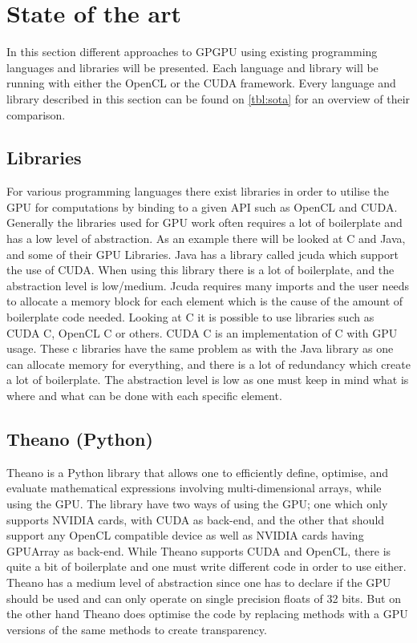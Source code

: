 \section{State of the art} %
\label{sec:state_of_the_art}
In this section different approaches to GPGPU using existing programming languages and libraries will be presented.
Each language and library will be running with either the OpenCL or the CUDA framework.
Every language and library described in this section can be found on \ref{tbl:sota} for an overview of their comparison.
      
\subsection{Libraries} 
For various programming languages there exist libraries in order to utilise the GPU for computations by binding to a given API such as OpenCL and CUDA.
Generally the libraries used for GPU work often requires a lot of boilerplate and has a low level of abstraction.
As an example there will be looked at C and Java, and some of their GPU Libraries.
Java has a library called jcuda which support the use of CUDA.
When using this library there is a lot of boilerplate, and the abstraction level is low/medium\citep{Java_library}. 
Jcuda requires many imports and the user needs to allocate a memory block for each element which is the cause of the amount of boilerplate code needed.\citep{Java_malloc}
Looking at C it is possible to use libraries such as CUDA C, OpenCL C or others.
CUDA C is an implementation of C with GPU usage.
These c libraries have the same problem as with the Java library as one can allocate memory for everything, and there is a lot of redundancy which create a lot of boilerplate.
The abstraction level is low as one must keep in mind what is where and what can be done with each specific element.\citep{C_CUDA}                                                  

\subsection{Theano (Python)}
Theano is a Python library that allows one to efficiently define, optimise, and evaluate mathematical expressions involving multi-dimensional arrays, while using the GPU.
The library have two ways of using the GPU; one which only supports NVIDIA cards, with CUDA as back-end, and the other that should support any OpenCL compatible device as well as NVIDIA cards having GPUArray as back-end.
While Theano supports CUDA and OpenCL, there is quite a bit of boilerplate and one must write different code in order to use either.
Theano has a medium level of abstraction since one has to declare if the GPU should be used and can only operate on single precision floats of 32 bits.
But on the other hand Theano does optimise the code by replacing methods with a GPU versions of the same methods to create transparency.\citep{Theano,Theano_GPU}

